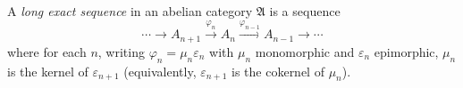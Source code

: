 A \textit{long exact sequence} in an abelian category $\mathfrak{A}$ is a sequence
$$
\cdots \to A_{n+1} \xrightarrow{\varphi_n} A_n \xrightarrow{\varphi_{n-1}} A_{n-1} \to \cdots
$$
where for each $n$, writing $\varphi_n = \mu_n \varepsilon_n$ with $\mu_n$ monomorphic and $\varepsilon_n$ epimorphic, $\mu_n$ is the kernel of $\varepsilon_{n+1}$ (equivalently, $\varepsilon_{n+1}$ is the cokernel of $\mu_n$).
